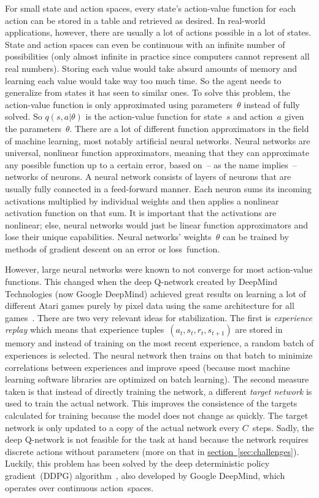 \documentclass[a4paper,titlepage]{article}
\begin{document}
For small state and action spaces, every state's action-value function for each action can be stored in a table and retrieved as desired. In real-world applications, however, there are usually a lot of actions possible in a lot of states. State and action spaces can even be continuous with an infinite number of possibilities (only almost infinite in practice since computers cannot represent all real numbers). Storing each value would take absurd amounts of memory and learning each value would take way too much time. So the agent needs to generalize from states it has seen to similar ones. To solve this problem, the action-value function is only approximated using parameters~$\theta$ instead of fully solved. So $q(s, a | \theta)$ is the action-value function for state~$s$ and action~$a$ given the parameters~$\theta$. There are a lot of different function approximators in the field of machine learning, most notably artificial neural networks. Neural networks are universal, nonlinear   function approximators, meaning that they can approximate any possible function up to a certain error, based on~-- as the name implies~-- networks of neurons. A neural network consists of layers of neurons that are usually fully connected in a feed-forward manner. Each neuron sums its incoming activations multiplied by individual weights and then applies a nonlinear activation function on that sum. %
It is important that the activations are nonlinear; else, neural networks would just be linear function approximators and lose their unique capabilities.
Neural networks' weights~$\theta$ can be trained by methods of gradient descent on an error or loss~function. %

However, large neural networks were known to not converge for most action-value functions. This changed when the deep Q-network created by DeepMind Technologies (now Google DeepMind) achieved great results on learning a lot of different Atari games purely by pixel data using the same architecture for all games~\cite{nature}. There are two very relevant ideas for stabilization. The first is \emph{experience replay} which means that experience tuples~$(a_t, s_t, r_t, s_{t+1})$ are stored in memory and instead of training on the most recent experience, a random batch of experiences is selected. The neural network then trains on that batch to minimize correlations between experiences and improve speed (because most machine learning software libraries are optimized on batch learning). The second measure taken is that instead of directly training the network, a different \emph{target network} is used to train the actual network. This improves the consistence of the targets calculated for training because the model does not change as quickly. The target network is only updated to a copy of the actual network every $C$~steps. Sadly, the deep Q-network is not feasible for the task at hand because the network requires discrete actions without parameters (more on that in \hyperref[sec:challenges]{section~\ref*{sec:challenges}}). Luckily, this problem has been solved by the deep deterministic policy gradient~(DDPG) algorithm~\cite{ddpg}, also developed by Google DeepMind, which operates over continuous action~spaces.
\end{document}
